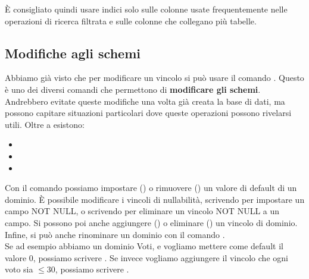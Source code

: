 \documentclass[11pt, a4paper, titlepage, oneside]{scrbook}
\begin{document}
È consigliato quindi usare indici solo sulle colonne usate frequentemente nelle operazioni di ricerca filtrata e sulle colonne che collegano più tabelle.

\subsection*{Modifiche agli schemi}

Abbiamo già visto che per modificare un vincolo  si può usare il comando . Questo è uno dei diversi comandi che permettono di \textbf{modificare gli schemi}. Andrebbero evitate queste modifiche una volta già creata la base di dati, ma possono capitare situazioni particolari dove queste operazioni possono rivelarsi utili. Oltre a  esistono:
\begin{itemize}
    \item {}
    \item {}
    \item {}
\end{itemize}

Con il comando  possiamo impostare () o rimuovere () un valore di default di un dominio. È possibile modificare i vincoli di nullabilità, scrivendo  per impostare un campo NOT NULL, o scrivendo  per eliminare un vincolo NOT NULL a un campo. Si possono poi anche aggiungere () o eliminare () un vincolo di dominio. Infine, si può anche rinominare un dominio con il comando . \\
Se ad esempio abbiamo un dominio Voti, e vogliamo mettere come default il valore 0, possiamo scrivere . Se invece vogliamo aggiungere il vincolo che ogni voto sia $\leq 30$, possiamo scrivere \mbox{}.
\end{document}
